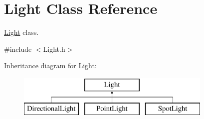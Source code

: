 \hypertarget{class_light}{}\section{Light Class Reference}
\label{class_light}


\hyperlink{class_light}{Light} class.  




{\ttfamily \#include $<$Light.\+h$>$}

Inheritance diagram for Light\+:\begin{figure}[H]
\begin{center}
\leavevmode
\includegraphics[height=2.000000cm]{class_light}
\end{center}
\end{figure}
